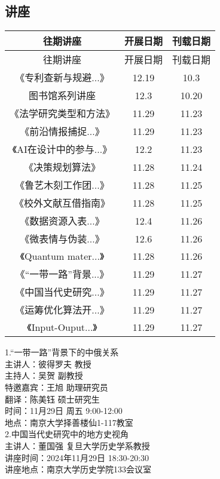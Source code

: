 \documentclass[letterpaper, 12pt]{article}
\begin{document}
\begin{multicols}{2}

\section{讲座}
\begin{tabular}{|c|c|c|}
    \hline
    往期讲座 & 开展日期 & 刊载日期\\
    \hline\hline
    往期讲座 & 开展日期 & 刊载日期\\
    《专利查新与规避...》 & 12.19 & 10.3\\
    图书馆系列讲座 & 12.3 & 10.20\\
    《法学研究类型和方法》 & 11.29 & 11.23\\
    《前沿情报捕捉...》 & 11.29 & 11.23\\
    《AI在设计中的参与...》 & 12.2 & 11.23\\
    《决策规划算法》 & 11.28 & 11.24\\
    《鲁艺木刻工作团...》 & 11.28 & 11.25\\
    《校外文献互借指南》 & 11.28 & 11.25\\
    《数据资源入表...》 & 12.4 & 11.26\\
    《微表情与伪装...》 & 12.6 & 11.26\\
    《Quantum mater...》 & 11.28 & 11.26\\
    《“一带一路”背景...》& 11.29 & 11.27\\
    《中国当代史研究...》& 11.29 & 11.27\\
    《运筹优化算法开...》 & 11.29 & 11.27\\
    《Input-Ouput...》 & 11.29 & 11.27\\
    \hline
\end{tabular}

1.“一带一路”背景下的中俄关系\\
主讲人：彼得罗夫 教授\\
主持人：吴贺 副教授\\
特邀嘉宾：王旭 助理研究员\\
翻译：陈美钰 硕士研究生\\
时间：11月29日 周五 9:00-12:00\\
地点：南京大学择善楼仙1-117教室\\

2.中国当代史研究中的地方史视角\\
主讲人：董国强  复旦大学历史学系教授\\
讲座时间：2024年11月29日 18:30-20:30\\
讲座地点：南京大学历史学院133会议室 \\


\end{multicols}
\end{document}
